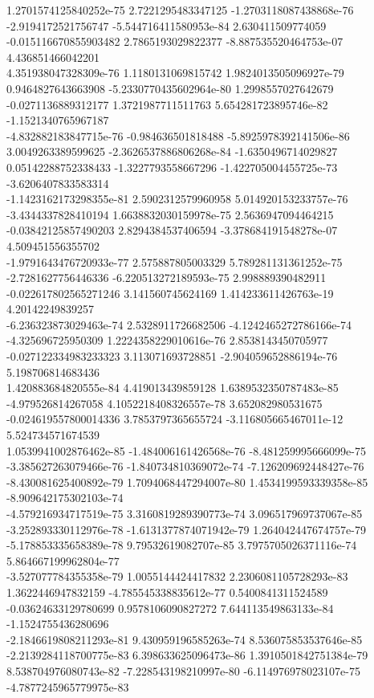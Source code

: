 \documentclass[11pt,titlepage,dvipdfmx,twoside]{jarticle}
\begin{document}
\begin{oframed}
1.2701574125840252e-75 2.7221295483347125 -1.2703118087438868e-76 -2.9194172521756747 -5.544716411580953e-84 2.630411509774059 -0.015116670855903482 2.7865193029822377 -8.887535520464753e-07 4.436851466042201   \\
4.351938047328309e-76 1.1180131069815742 1.9824013505096927e-79 0.9464827643663908 -5.2330770435602964e-80 1.2998557027642679 -0.0271136889312177 1.3721987711511763 5.654281723895746e-82 -1.1521340765967187   \\
-4.832882183847715e-76 -0.984636501818488 -5.8925978392141506e-86 3.0049263389599625 -2.3626537886806268e-84 -1.6350496714029827 0.05142288752338433 -1.3227793558667296 -1.422705004455725e-73 -3.6206407833583314   \\
-1.1423162173298355e-81 2.5902312579960958 5.014920153233757e-76 -3.4344337828410194 1.6638832030159978e-75 2.5636947094464215 -0.03842125857490203 2.8294384537406594 -3.378684191548278e-07 4.509451556355702   \\
-1.9791643476720933e-77 2.575887805003329 5.789281131361252e-75 -2.7281627756446336 -6.220513272189593e-75 2.998889390482911 -0.022617802565271246 3.141560745624169 1.414233611426763e-19 4.20142249839257   \\
-6.236323873029463e-74 2.5328911726682506 -4.1242465272786166e-74 -4.325696725950309 1.2224358229010616e-76 2.8538143450705977 -0.027122334983233323 3.113071693728851 -2.904059652886194e-76 5.198706814683436   \\
1.420883684820555e-84 4.419013439859128 1.6389532350787483e-85 -4.979526814267058 4.1052218408326557e-78 3.652082980531675 -0.024619557800014336 3.7853797365655724 -3.116805665467011e-12 5.524734571674539   \\
1.0539941002876462e-85 -1.484006161426568e-76 -8.481259995666099e-75 -3.385627263079466e-76 -1.840734810369072e-74 -7.126209692448427e-76 -8.430081625400892e-79 1.7094068447294007e-80 1.4534199593339358e-85 -8.909642175302103e-74   \\
-4.579216934717519e-75 3.3160819289390773e-74 3.096517969737067e-85 -3.252893330112976e-78 -1.6131377874071942e-79 1.264042447674757e-79 -5.178853335658389e-78 9.79532619082707e-85 3.7975705026371116e-74 5.864667199962804e-77   \\
-3.527077784355358e-79 1.0055144424417832 2.2306081105728293e-83 1.3622446947832159 -4.785545338835612e-77 0.5400841311524589 -0.03624633129780699 0.9578106090827272 7.644113549863133e-84 -1.1524755436280696   \\
-2.1846619808211293e-81 9.430959196585263e-74 8.536075853537646e-85 -2.2139284118700775e-83 6.398633625096473e-86 1.3910501842751384e-79 8.538704976080743e-82 -7.228543198210997e-80 -6.114976978023107e-75 -4.7877245965779975e-83   \\

\end{oframed}
\end{document}
